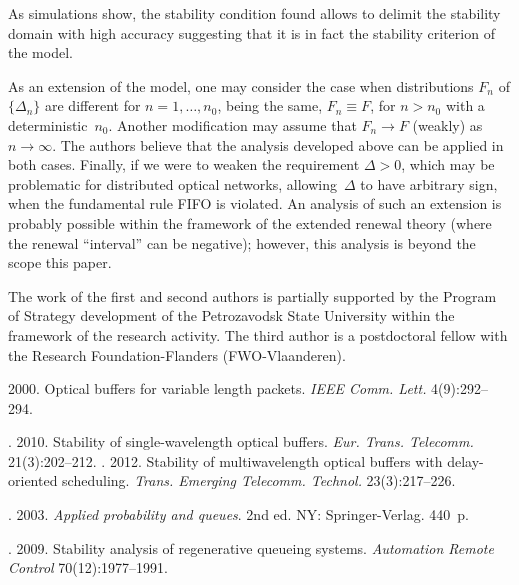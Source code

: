 \begin{multicols}{2}
As simulations show, the stability condition found  allows to
delimit the stability domain with high accuracy suggesting
that it is in fact the stability criterion of the model.

As an extension of the model, one may  consider the case when
distributions $F_n $ of  $\{\Delta_n\}$ are different for
$n=1,\ldots,n_0$, being  the same, $F_n\equiv F$, for $n>n_0$ with a
 deterministic~$n_0$. Another modification may   assume that
$F_{n}\to F$ (weakly) as $n\to \infty$. The authors believe that the analysis
developed above can be applied in both cases. Finally, if we were to
weaken the requirement $\Delta>0$, which may be problematic for
distributed optical networks,  allowing~$\Delta$ to have  arbitrary
sign, when the fundamental rule FIFO  is violated. An analysis of such
an extension  is probably possible  within the framework of the extended
renewal theory (where the renewal ``interval'' can be negative); however,
this analysis is beyond the scope this paper.



\Ack
The work of the first and second  authors is partially supported by the
Program of Strategy development of the Petrozavodsk State University within
the framework of the research activity. The third author is a
postdoctoral fellow with the Research Foundation-Flanders
(FWO-Vlaanderen).


{\small\frenchspacing
{%
\begin{thebibliography}{9}

2000. Optical buffers for variable
length packets. \textit{IEEE Comm. Lett.}
4(9):292--294.

.
2010. Stability of single-wavelength optical buffers.
\textit{Eur. Trans.   Telecomm.} 21(3):202--212.
. 2012. 
Stability of
multiwavelength optical buffers with delay-oriented scheduling.
\textit{Trans. Emerging Telecomm. Technol.} 23(3):217--226.

. 2003. \textit{Applied probability and queues}. 2nd
ed.  NY: Springer-Verlag. 440~p.





. 
2009. Stability analysis of regenerative
queueing  systems. \textit{Automation Remote Control} 70(12):1977--1991.


\end{thebibliography}}}
\end{multicols}

